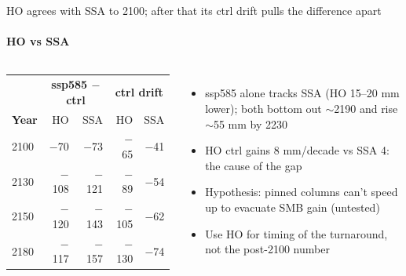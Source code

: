 \documentclass[aspectratio=169,10pt]{beamer}
\makeatletter
\newcommand{\source}[1]{\gdef\beamer@shortsource{#1}}
\gdef\beamer@shortsource{}
\makeatother
\begin{document}
\source{ISMIP-convention VAF, mm, minus control. HO beyond 2100 from the running extension.}
\begin{frame}{HO agrees with SSA to 2100; after that its ctrl drift pulls the difference apart}
\framesubtitle{HO vs SSA}
\vspace{2mm}\small
\begin{columns}[T]
\begin{tabular}{@{}lrrrr@{}}
\toprule
& \multicolumn{2}{c}{\textbf{ssp585 $-$ ctrl}} & \multicolumn{2}{c}{\textbf{ctrl drift}}\\
\textbf{Year} & HO & SSA & HO & SSA\\
\midrule
2100 & $-$70 & $-$73 & $-$65 & $-$41\\
2130 & $-$108 & $-$121 & $-$89 & $-$54\\
2150 & $-$120 & $-$143 & $-$105 & $-$62\\
2180 & $-$117 & $-$157 & $-$130 & $-$74\\
\bottomrule
\end{tabular}
\begin{itemize}
\item ssp585 alone tracks SSA (HO 15--20 mm lower); both bottom out $\sim$2190 and rise $\sim$55 mm by 2230
\item HO ctrl gains 8 mm/decade vs SSA 4: the cause of the gap
\item Hypothesis: pinned columns can't speed up to evacuate SMB gain (untested)
\item Use HO for timing of the turnaround, not the post-2100 number
\end{itemize}
\end{columns}
\end{frame}
\end{document}
